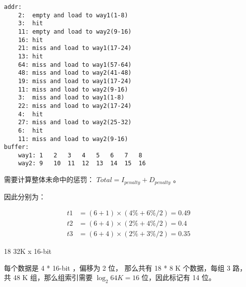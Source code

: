 \documentclass[lang=cn,11pt,a4paper,cite=authoryear]{elegantpaper}
\begin{document}

\begin{lstlisting}
addr:
    2:  empty and load to way1(1-8)
    3:  hit 
    11: empty and load to way2(9-16) 
    16: hit 
    21: miss and load to way1(17-24)
    13: hit
    64: miss and load to way1(57-64)
    48: miss and load to way2(41-48)
    19: miss and load to way1(17-24)
    11: miss and load to way2(9-16)
    3:  miss and load to way1(1-8)
    22: miss and load to way2(17-24)
    4:  hit 
    27: miss and load to way2(25-32)
    6:  hit 
    11: miss and load to way2(9-16)
buffer:  
    way1: 1   2   3   4   5   6   7   8
    way2: 9   10  11  12  13  14  15  16
\end{lstlisting}


需要计算整体未命中的惩罚： \(Total = I_{penalty} + D_{penalty}\) 。

因此分别为：

\[\begin{aligned}
    t1 &= (6 + 1) \times (4\% + 6\% / 2) = 0.49 \\
    t2 &= (6 + 4) \times (2\% + 4\% / 2) = 0.4 \\ 
    t3 &= (6 + 4) \times (2\% + 3\% / 2) = 0.35
\end{aligned}\]


18 32K x 16-bit 

每个数据是 4 * 16-bit ，偏移为 2 位， 那么共有 18 * 8 K 个数据，每组 3 路， 共 48 K 组，那么组索引需要 \(\log_2 64 K = 16\) 位，因此标记有 14 位。


\end{document}
